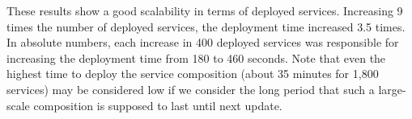 These results show a good scalability in terms of deployed services.
Increasing 9 times the number of deployed services, the deployment time increased 3.5 times.
In absolute numbers, each increase in 400 deployed services 
was responsible for increasing the deployment time from 180 to 460 seconds. 
Note that even the highest time to deploy the service composition 
(about 35 minutes for 1,800 services) 
may be considered low if we consider the long period that 
such a large-scale composition is supposed to last until next update.


